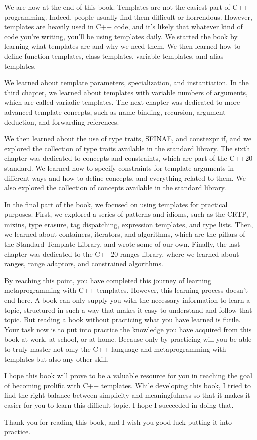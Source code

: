 We are now at the end of this book. Templates are not the easiest part of C++ programming. Indeed, people usually find them difficult or horrendous. However, templates are heavily used in C++ code, and it’s likely that whatever kind of code you’re writing, you’ll be using templates daily. We started the book by learning what templates are and why we need them. We then learned how to define function templates, class templates, variable templates, and alias templates.

We learned about template parameters, specialization, and instantiation. In the third chapter, we learned about templates with variable numbers of arguments, which are called variadic templates. The next chapter was dedicated to more advanced template concepts, such as name binding, recursion, argument deduction, and forwarding references.

We then learned about the use of type traits, SFINAE, and constexpr if, and we explored the collection of type traits available in the standard library. The sixth chapter was dedicated to concepts and constraints, which are part of the C++20 standard. We learned how to specify constraints for template arguments in different ways and how to define concepts, and everything related to them. We also explored the collection of concepts available in the standard library.

In the final part of the book, we focused on using templates for practical purposes. First, we explored a series of patterns and idioms, such as the CRTP, mixins, type erasure, tag dispatching, expression templates, and type lists. Then, we learned about containers, iterators, and algorithms, which are the pillars of the Standard Template Library, and wrote some of our own. Finally, the last chapter was dedicated to the C++20 ranges library, where we learned about ranges, range adaptors, and constrained algorithms.

By reaching this point, you have completed this journey of learning metaprogramming with C++ templates. However, this learning process doesn’t end here. A book can only supply you with the necessary information to learn a topic, structured in such a way that makes it easy to understand and follow that topic. But reading a book without practicing what you have learned is futile. Your task now is to put into practice the knowledge you have acquired from this book at work, at school, or at home. Because only by practicing will you be able to truly master not only the C++ language and metaprogramming with templates but also any other skill.

I hope this book will prove to be a valuable resource for you in reaching the goal of becoming prolific with C++ templates. While developing this book, I tried to find the right balance between simplicity and meaningfulness so that it makes it easier for you to learn this difficult topic. I hope I succeeded in doing that.

Thank you for reading this book, and I wish you good luck putting it into practice.